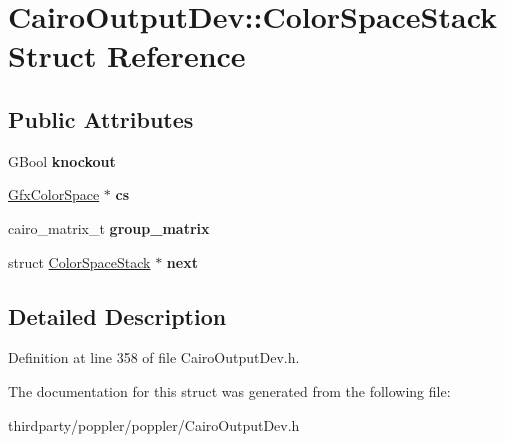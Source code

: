 \hypertarget{struct_cairo_output_dev_1_1_color_space_stack}{}\section{Cairo\+Output\+Dev\+:\+:Color\+Space\+Stack Struct Reference}
\label{struct_cairo_output_dev_1_1_color_space_stack}
\subsection*{Public Attributes}
\begin{DoxyCompactItemize}
\item 
\mbox{\label{struct_cairo_output_dev_1_1_color_space_stack_ab04435273d4140a4c0cb85fb6bc76090}} 
G\+Bool {\bfseries knockout}
\item 
\mbox{\label{struct_cairo_output_dev_1_1_color_space_stack_ad6a10bb5751999b17d5b6d673c7b62a5}} 
\hyperlink{class_gfx_color_space}{Gfx\+Color\+Space} $\ast$ {\bfseries cs}
\item 
\mbox{\label{struct_cairo_output_dev_1_1_color_space_stack_a7f10078b9befe60879173aad82e25f46}} 
cairo\+\_\+matrix\+\_\+t {\bfseries group\+\_\+matrix}
\item 
\mbox{\label{struct_cairo_output_dev_1_1_color_space_stack_aeccaa40038070026382b8ef8a54c4991}} 
struct \hyperlink{struct_cairo_output_dev_1_1_color_space_stack}{Color\+Space\+Stack} $\ast$ {\bfseries next}
\end{DoxyCompactItemize}


\subsection{Detailed Description}


Definition at line 358 of file Cairo\+Output\+Dev.\+h.



The documentation for this struct was generated from the following file\+:\begin{DoxyCompactItemize}
\item 
thirdparty/poppler/poppler/Cairo\+Output\+Dev.\+h\end{DoxyCompactItemize}
